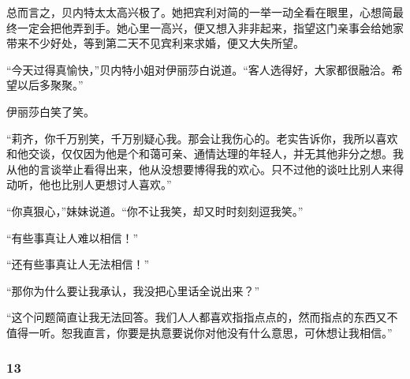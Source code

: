 \par 总而言之，贝内特太太高兴极了。她把宾利对简的一举一动全看在眼里，心想简最终一定会把他弄到手。她心里一高兴，便又想入非非起来，指望这门亲事会给她家带来不少好处，等到第二天不见宾利来求婚，便又大失所望。
\par “今天过得真愉快，”贝内特小姐对伊丽莎白说道。“客人选得好，大家都很融洽。希望以后多聚聚。”
\par 伊丽莎白笑了笑。
\par “莉齐，你千万别笑，千万别疑心我。那会让我伤心的。老实告诉你，我所以喜欢和他交谈，仅仅因为他是个和蔼可亲、通情达理的年轻人，并无其他非分之想。我从他的言谈举止看得出来，他从没想要博得我的欢心。只不过他的谈吐比别人来得动听，他也比别人更想讨人喜欢。”
\par “你真狠心，”妹妹说道。“你不让我笑，却又时时刻刻逗我笑。”
\par “有些事真让人难以相信！”
\par “还有些事真让人无法相信！”
\par “那你为什么要让我承认，我没把心里话全说出来？”
\par “这个问题简直让我无法回答。我们人人都喜欢指指点点的，然而指点的东西又不值得一听。恕我直言，你要是执意要说你对他没有什么意思，可休想让我相信。”



\subsubsection*{13}

